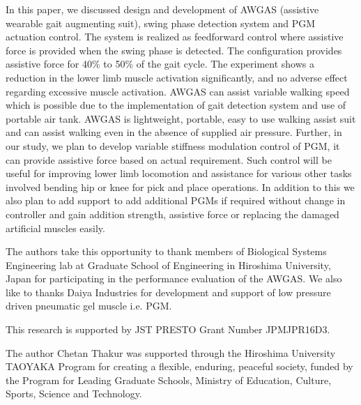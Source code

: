 \documentclass[paper,JRM,paper]{jaciiiarticle}
\begin{document}
In this paper, we discussed design and development of AWGAS (assistive wearable gait augmenting suit), swing phase detection system and PGM actuation control. The system is realized as feedforward control where assistive force is provided when the swing phase is detected. The configuration provides assistive force for 40\% to 50\% of the gait cycle. The experiment shows a reduction in the lower limb muscle activation significantly, and no adverse effect regarding excessive muscle activation. AWGAS can assist variable walking speed which is possible due to the implementation of gait detection system and use of portable air tank. AWGAS is lightweight, portable, easy to use walking assist suit and can assist walking even in the absence of supplied air pressure. Further, in our study, we plan to develop variable stiffness modulation control of PGM, it can provide assistive force based on actual requirement. Such control will be useful for improving lower limb locomotion and assistance for various other tasks involved bending hip or knee for pick and place operations. In addition to this we also plan to add support to add additional PGMs if required without change in controller and gain addition strength, assistive force or replacing the damaged artificial muscles easily.

\acknowledgements
The authors take this opportunity to thank members of Biological Systems Engineering lab at Graduate School of Engineering in Hiroshima University, Japan for participating in the performance evaluation of the AWGAS. We also like to thanks Daiya Industries for development and support of low pressure driven pneumatic gel muscle i.e. PGM.

This research is supported by JST PRESTO Grant Number JPMJPR16D3.

The author Chetan Thakur was supported through the Hiroshima University
TAOYAKA Program for creating a flexible, enduring, peaceful society, funded by the Program for Leading
Graduate Schools, Ministry of Education, Culture, Sports, Science and Technology.  


%

\end{document}
